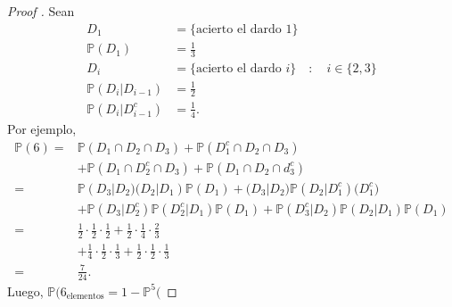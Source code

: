 \begin{proof}[Proof ]
	Sean
	\begin{align*}
		D_1 &= \{\text{acierto el dardo } 1\}   \\
		\mathbb{P}(D_1) & = \frac{1}{3} \\
		D_i &= \{\text{acierto el dardo } i\} \quad : \quad i \in \{2,3\}  \\
		\mathbb{P}(D_i|D_{i-1}) &= \frac{1}{2} \\
		\mathbb{P}(D_i|D_{i-1}^c) &= \frac{1}{4}
	.\end{align*}
	Por ejemplo,
	\begin{align*}
		\mathbb{P}(6) = & \mathbb{P}(D_1\cap D_2 \cap D_{3}) + \mathbb{P}(D_1^c \cap D_2 \cap D_3) \\
		& + \mathbb{P}(D_1\cap D_2^c \cap D_{3}) + \mathbb{P}(D_1\cap D_{2} \cap d_{3}^c) \\
		= & \mathbb{P}(D_{3}|D_{2})\mathbb(D_{2}|D_{1}) \mathbb{P}(D_{1}) + \mathbb(D_{3}|D_{2}) \mathbb{P}(D_{2}|D_{1}^c)\mathbb(D_{1}^c) \\
		& + \mathbb{P}(D_{3}|D_{2}^c)\mathbb{P}(D_{2}^c|D_{1}) \mathbb{P}(D_{1}) + \mathbb{P}(D_{3}^c|D_{2}) \mathbb{P}(D_{2}|D_{1}) \mathbb{P}(D_{1}) \\
		= & \frac{1}{2}\cdot\frac{1}{2}\cdot\frac{1}{2} + \frac{1}{2}\cdot\frac{1}{4}\cdot\frac{2}{3} \\
		& + \frac{1}{4}\cdot\frac{1}{2}\cdot\frac{1}{3}  + \frac{1}{2}\cdot\frac{1}{2}\cdot\frac{1}{3} \\
		= & \frac{7}{24}
	.\end{align*}
	Luego, $\mathbb{P}(6_{\text{elementos}} = 1 - \mathbb{P}^5($
\end{proof}
